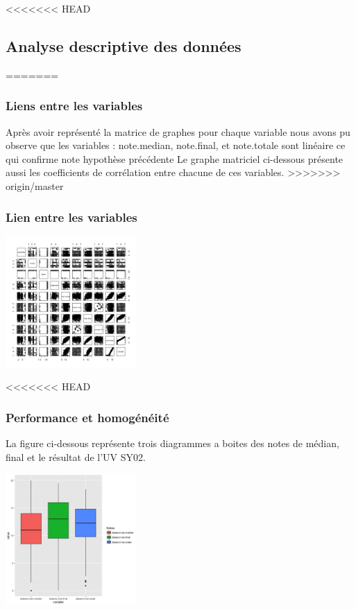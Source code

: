 \documentclass[]{report}
\begin{document}
<<<<<<< HEAD
 \subsection{Analyse descriptive des données}
=======
\subsubsection{Liens entre les variables}
Après avoir représenté la matrice de graphes pour chaque variable nous avons pu observe que les variables : note.median, note.final, et note.totale sont linéaire ce qui confirme note hypothèse précédente Le graphe matriciel ci-dessous présente aussi les coefficients de corrélation entre chacune de ces variables.
>>>>>>> origin/master

\subsubsection{Lien entre les variables}
	\begin{center}
	\includegraphics[width=50mm]{Figures/Notes/multiplot.jpg}
	\label{fig:multiplot_notes}
\end{center}

<<<<<<< HEAD
\subsubsection{Performance et homogénéité}
La figure ci-dessous représente trois diagrammes a boites des notes de médian, final et le résultat de l'UV SY02.
	\begin{center}
			\includegraphics[width=50mm]{Figures/Notes/boxplot_exam.jpg}
		    \label{fig:Boxplot_notes}
	\end{center}
\end{document}
